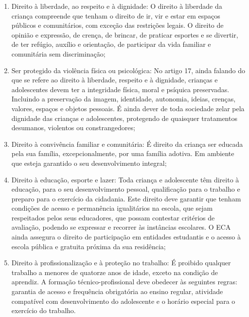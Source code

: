 \begin{enumerate}
\item Direito à liberdade, ao respeito e à dignidade: O direito à
liberdade da criança compreende que tenham o direito de ir, vir e estar
em espaços públicos e comunitários, com exceção das restrições legais. O
direito de opinião e expressão, de crença, de brincar, de praticar
esportes e se divertir, de ter refúgio, auxílio e orientação, de
participar da vida familiar e comunitária sem discriminação;

\item Ser protegido da violência física ou psicológica: No artigo 17,
ainda falando do que se refere ao direito à liberdade, respeito e à
dignidade, crianças e adolescentes devem ter a integridade física, moral
e psíquica preservadas. Incluindo a preservação da imagem, identidade,
autonomia, ideias, crenças, valores, espaços e objetos pessoais. É ainda
dever de toda sociedade zelar pela dignidade das crianças e
adolescentes, protegendo de quaisquer tratamentos desumanos, violentos
ou constrangedores;

\item Direito à convivência familiar e comunitária: É direito da criança
ser educada pela sua família, excepcionalmente, por uma família adotiva.
Em ambiente que esteja garantido o seu desenvolvimento integral;

\item Direito à educação, esporte e lazer: Toda criança e adolescente têm
direito à educação, para o seu desenvolvimento pessoal, qualificação
para o trabalho e preparo para o exercício da cidadania. Este direito
deve garantir que tenham condições de acesso e permanência igualitários
na escola, que sejam respeitados pelos seus educadores, que possam
contestar critérios de avaliação, podendo se expressar e recorrer às
instâncias escolares. O ECA ainda assegura o direito de participação em
entidades estudantis e o acesso à escola pública e gratuita próxima da
sua residência;

\item Direito à profissionalização e à proteção no trabalho: É proibido
qualquer trabalho a menores de quatorze anos de idade, exceto na
condição de aprendiz. A formação técnico-profissional deve obedecer às
seguintes regras: garantia de acesso e frequência obrigatória ao ensino
regular, atividade compatível com desenvolvimento do adolescente e o
horário especial para o exercício do trabalho.
\end{enumerate}

